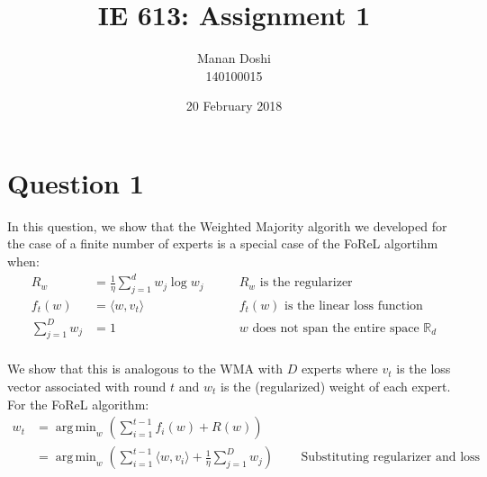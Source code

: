 \documentclass{article}
\title{IE 613: Assignment 1}
\author{Manan Doshi \\ 140100015}
\date{20 February 2018}
\DeclareMathOperator*{\argmin}{arg\,min}
\begin{document}
\graphicspath{{./plots}}
\maketitle

\section*{Question 1}

In this question, we show that the Weighted Majority algorith we developed for the case of a finite number of experts is a special case of the FoReL algortihm when:
\begin{align*}
    R_w  &= \frac{1}{\eta}\sum_{j=1}^{d} w_j \log w_j \qquad &\text{$R_w$ is the regularizer}\\
    f_t(w) &= \langle w,v_t \rangle \qquad &\text{$f_t(w)$ is the linear loss function}\\
    \sum_{j=1}^{D} w_j &= 1 \qquad &\text{$w$ does not span the entire space $\mathbb{R}_d$}\\
\end{align*}

We show that this is analogous to the WMA with $D$ experts where $v_t$ is the loss vector associated with round $t$ and $w_t$ is the (regularized) weight of each expert.\\
For the FoReL algorithm:
\begin{align*}
    w_t &= \argmin_{w} \left( \sum_{i=1}^{t-1} f_i(w) + R(w) \right) &\qquad\\
    &= \argmin_{w} \left( \sum_{i=1}^{t-1} \langle w,v_i \rangle + \frac{1}{\eta} \sum_{j=1}^{D} w_j \right) &\qquad \text{Substituting regularizer and loss terms}\\
\end{align*}
\end{document}

